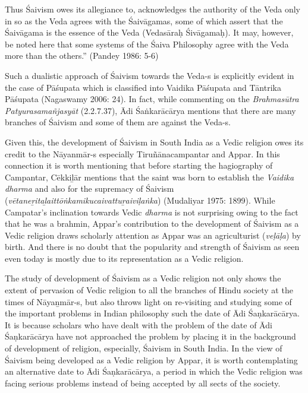 \begin{myquote}
Thus Śaivism owes its allegiance to, acknowledges the authority of the Veda only in so as the Veda agrees with the Śaivāgamas, some of which assert that the Śaivāgama is the essence of the Veda (Vedasāraḥ Śivāgamaḥ). It may, however, be noted here that some systems of the Śaiva Philosophy agree with the Veda more than the others.” (Pandey 1986: 5-6)
\end{myquote}

\vskip 1pt

Such a dualistic approach of Śaivism towards the Veda-s is explicitly evident in the case of Pāśupata which is classified into Vaidika Pāśupata and Tāntrika Pāśupata (Nagaswamy 2006: 24). In fact, while commenting on the \textit{Brahmasūtra Patyurasamañjasyāt} (2.2.7.37), Ādi Śaṅkarācārya mentions that there are many branches of Śaivism and some of them are against the Veda-s.

\vskip 1pt

Given this, the development of Śaivism in South India as a Vedic religion owes its credit to the Nāyanmār-s especially Tiruñānacampantar and Appar. In this connection it is worth mentioning that before starting the hagiography of Campantar, Cēkkiḻār mentions that the saint was born to establish the \textit{Vaidika dharma }and also for the supremacy of Śaivism (\textit{vētaneṟitaḻaittōṅkamikucaivattuṟaiviḷaṅka}) (Mudaliyar 1975: 1899). While Campatar’s inclination towards Vedic \textit{dharma} is not surprising owing to the fact that he was a brahmin, Appar’s contribution to the development of Śaivism as a Vedic religion draws scholarly attention as Appar was an agriculturist (\textit{veḷāḷa}) by birth. And there is no doubt that the popularity and strength of Śaivism as seen even today is mostly due to its representation as a Vedic religion.

\vskip 1pt

The study of development of Śaivism as a Vedic religion not only shows the extent of pervasion of Vedic religion to all the branches of Hindu society at the times of Nāyaṉmār-s, but also throws light on re-visiting and studying some of the important problems in Indian philosophy such the date of Ādi Śaṇkarācārya. It is because scholars who have dealt with the problem of the date of Ādi Śaṇkarācārya have not approached the problem by placing it in the background of development of religion, especially, Śaivism in South India. In the view of Śaivism being developed as a Vedic religion by Appar, it is worth contemplating an alternative date to Ādi Śaṇkarācārya, a period in which the Vedic religion was facing serious problems instead of being accepted by all sects of the society.


